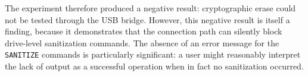 The experiment therefore produced a negative result: cryptographic erase could not be tested through the USB bridge. However, this negative result is itself a finding, 
because it demonstrates that the connection path can silently block drive-level sanitization commands. The absence of an error message for the \texttt{SANITIZE} 
commands is particularly significant: a user might reasonably interpret the lack of output as a successful operation when in fact no sanitization occurred.